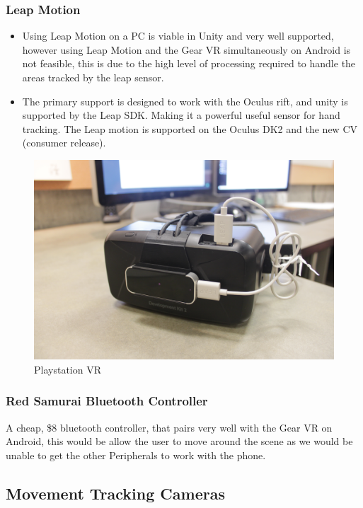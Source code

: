 \documentclass[a4paper,10pt,twoside]{article}
\begin{document}
\subsubsection{Leap Motion}
\begin{itemize}
	\item Using Leap Motion on a PC is viable in Unity and very well supported, however using Leap Motion and the Gear VR simultaneously on Android is not feasible, this is due to the high level of processing required to
	handle the areas tracked by the leap sensor. 
	\item The primary support is designed to work with the Oculus rift, and unity is supported by the Leap SDK. Making it a powerful useful sensor for hand tracking. The 
	Leap motion is supported on the Oculus DK2 and the new CV (consumer release). 
\end{itemize}
\begin{figure}[H]
	\centerline{\includegraphics[scale= 0.08]{leap.jpg}}
	\caption{Playstation VR}
	\label{fig:leapImg}
\end{figure}
	
	
\subsubsection{Red Samurai Bluetooth Controller}
	A cheap, \$8 bluetooth controller, that pairs very well with the Gear VR on Android, this would be allow the user to move around the scene as we would be unable to get the other Peripherals to work with the phone.
\pagebreak
\subsection{Movement Tracking Cameras}
\end{document}
